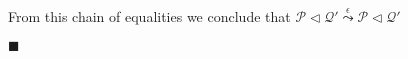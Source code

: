 \begin{theorem}
  From this chain of equalities we conclude that
  $\mathcal{P} \lhd \mathcal{Q}' \overset{\epsilon}{\leadsto} \mathcal{P} \lhd \mathcal{Q}'$

  $\blacksquare$
\end{theorem}
